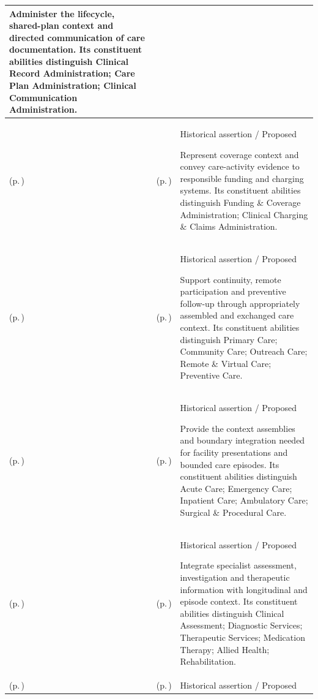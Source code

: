 \begin{longtable}{|>{\raggedright\arraybackslash}p{0.27\TableWidth}|>{\raggedright\arraybackslash}p{0.27\TableWidth}|>{\raggedright\arraybackslash}p{0.46\TableWidth}|}
Administer the lifecycle, shared-plan context and directed communication of care documentation. Its constituent abilities distinguish Clinical Record Administration; Care Plan Administration; Clinical Communication Administration.\\\hline
\nameref{cap:bec-care-administration-information-enablement} (p.\,\pageref{cap:bec-care-administration-information-enablement}) & \nameref{cap:bec-care-financial-information-enablement} (p.\,\pageref{cap:bec-care-financial-information-enablement}) & Historical assertion / Proposed

Represent coverage context and convey care-activity evidence to responsible funding and charging systems. Its constituent abilities distinguish Funding \& Coverage Administration; Clinical Charging \& Claims Administration.\\\hline
\nameref{cap:bec-care-context-integration-enablement} (p.\,\pageref{cap:bec-care-context-integration-enablement}) & \nameref{cap:bec-longitudinal-community-care-integration} (p.\,\pageref{cap:bec-longitudinal-community-care-integration}) & Historical assertion / Proposed

Support continuity, remote participation and preventive follow-up through appropriately assembled and exchanged care context. Its constituent abilities distinguish Primary Care; Community Care; Outreach Care; Remote \& Virtual Care; Preventive Care.\\\hline
\nameref{cap:bec-care-context-integration-enablement} (p.\,\pageref{cap:bec-care-context-integration-enablement}) & \nameref{cap:bec-facility-episodic-care-integration} (p.\,\pageref{cap:bec-facility-episodic-care-integration}) & Historical assertion / Proposed

Provide the context assemblies and boundary integration needed for facility presentations and bounded care episodes. Its constituent abilities distinguish Acute Care; Emergency Care; Inpatient Care; Ambulatory Care; Surgical \& Procedural Care.\\\hline
\nameref{cap:bec-care-context-integration-enablement} (p.\,\pageref{cap:bec-care-context-integration-enablement}) & \nameref{cap:bec-specialist-clinical-context-integration} (p.\,\pageref{cap:bec-specialist-clinical-context-integration}) & Historical assertion / Proposed

Integrate specialist assessment, investigation and therapeutic information with longitudinal and episode context. Its constituent abilities distinguish Clinical Assessment; Diagnostic Services; Therapeutic Services; Medication Therapy; Allied Health; Rehabilitation.\\\hline
\nameref{cap:bec-care-operations-coordination-enablement} (p.\,\pageref{cap:bec-care-operations-coordination-enablement}) & \nameref{cap:bec-care-setting-operations-enablement} (p.\,\pageref{cap:bec-care-setting-operations-enablement}) & Historical assertion / Proposed


\end{longtable}
